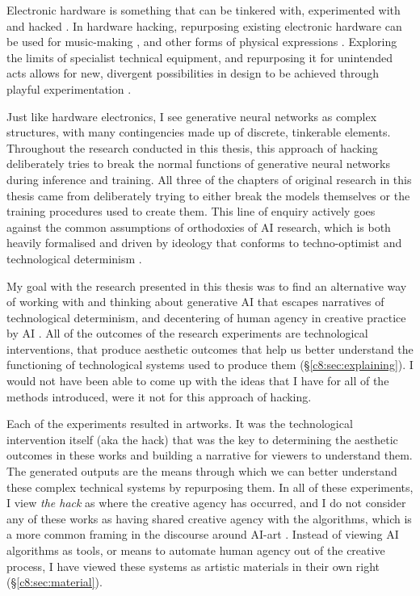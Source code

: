 Electronic hardware is something that can be tinkered with, experimented with and hacked \citep{collins2004hardware, grand2004hardware}. 
In hardware hacking, repurposing existing electronic hardware can be used for music-making \citep{collins2009handmade}, and other forms of physical expressions \citep{hartmann2008hacking}.
Exploring the limits of specialist technical equipment, and repurposing it for unintended acts allows for new, divergent possibilities in design to be achieved through playful experimentation \citep{goddard2015playful}.

Just like hardware electronics, I see generative neural networks as complex structures, with many contingencies made up of discrete, tinkerable elements.
Throughout the research conducted in this thesis, this approach of hacking deliberately tries to break the normal functions of generative neural networks during inference and training. 
All three of the chapters of original research in this thesis came from deliberately trying to either break the models themselves or the training procedures used to create them.
This line of enquiry actively goes against the common assumptions of orthodoxies of AI research, which is both heavily formalised and driven by ideology \citep{sias2021ideology} that conforms to techno-optimist \citep{andreesen2023techno} and technological determinism \citep{drew2016technological}. 

My goal with the research presented in this thesis was to find an alternative way of working with and thinking about generative AI that escapes narratives of technological determinism, and decentering of human agency in creative practice by AI \citep{zeilinger2021tactical}.
All of the outcomes of the research experiments are technological interventions, that produce aesthetic outcomes that help us better understand the functioning of technological systems used to produce them (\S \ref{c8:sec:explaining}). 
I would not have been able to come up with the ideas that I have for all of the methods introduced, were it not for this approach of hacking.

Each of the experiments resulted in artworks.
It was the technological intervention itself (aka the hack) that was the key to determining the aesthetic outcomes in these works and building a narrative for viewers to understand them.
The generated outputs are the means through which we can better understand these complex technical systems by repurposing them.
In all of these experiments, I view \textit{the hack} as where the creative agency has occurred, and I do not consider any of these works as having shared creative agency with the algorithms, which is a more common framing in the discourse around AI-art \citep{moruzzi2022creative}.
Instead of viewing AI algorithms as tools, or means to automate human agency out of the creative process, I have viewed these systems as artistic materials in their own right (\S \ref{c8:sec:material}).

